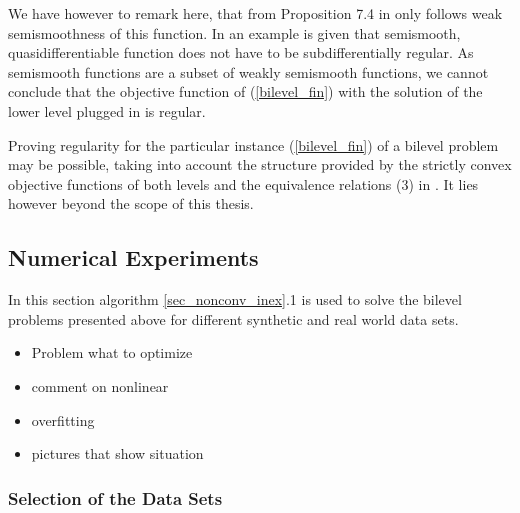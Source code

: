 We have however to remark here, that from Proposition 7.4 in \cite{Outrata1998} only follows weak semismoothness of this function.
In \cite[p. 82]{Spingarn1981} an example is given that semismooth, quasidifferentiable function does not have to be subdifferentially regular. As semismooth functions are a subset of weakly semismooth functions, we cannot conclude that the objective function of (\ref{bilevel_fin}) with the solution of the lower level plugged in is regular.

Proving regularity for the particular instance (\ref{bilevel_fin}) of a bilevel problem may be possible, taking into account the structure provided by the strictly convex objective functions of both levels and the equivalence relations (3) in \cite[p. 5]{Hare2016}. It lies however beyond the scope of this thesis.




\subsection{Numerical Experiments}

In this section algorithm \ref{sec_nonconv_inex}.1 is used to solve the bilevel problems presented above for different synthetic and real world data sets.

\begin{itemize}
	\item Problem what to optimize
	\item comment on nonlinear 
	\item overfitting
	\item pictures that show situation
\end{itemize}


\subsubsection{Selection of the Data Sets}

